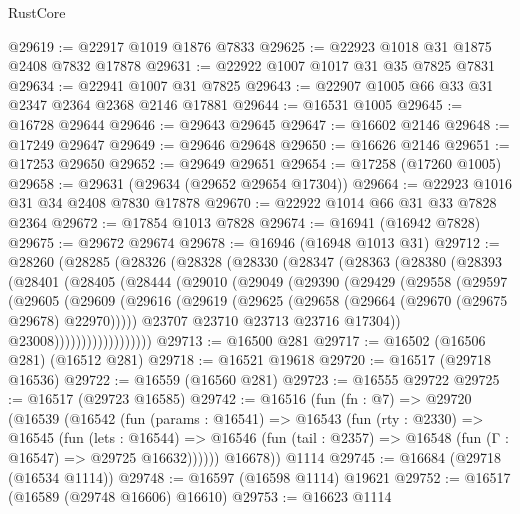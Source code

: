 \begin{lexlean}{RustCore}
\begin{coremodule}
@29619 := @22917 @1019 @1876 @7833
@29625 := @22923 @1018 @31 @1875 @2408 @7832 @17878
@29631 := @22922 @1007 @1017 @31 @35 @7825 @7831
@29634 := @22941 @1007 @31 @7825
@29643 := @22907 @1005 @66 @33 @31 @2347 @2364 @2368 @2146 @17881
@29644 := @16531 @1005
@29645 := @16728 @29644
@29646 := @29643 @29645
@29647 := @16602 @2146
@29648 := @17249 @29647
@29649 := @29646 @29648
@29650 := @16626 @2146
@29651 := @17253 @29650
@29652 := @29649 @29651
@29654 := @17258 (@17260 @1005)
@29658 := @29631 (@29634 (@29652 @29654 @17304))
@29664 := @22923 @1016 @31 @34 @2408 @7830 @17878
@29670 := @22922 @1014 @66 @31 @33 @7828 @2364
@29672 := @17854 @1013 @7828
@29674 := @16941 (@16942 @7828)
@29675 := @29672 @29674
@29678 := @16946 (@16948 @1013 @31)
@29712 := @28260
    (@28285
      (@28326
        (@28328
          (@28330
            (@28347
              (@28363
                (@28380
                  (@28393
                    (@28401
                      (@28405
                        (@28444
                          (@29010
                            (@29049
                              (@29390
                                (@29429
                                  (@29558
                                    (@29597
                                      (@29605
                                        (@29609
                                          (@29616
                                            (@29619
                                              (@29625
                                                (@29658 (@29664 (@29670 (@29675 @29678) @22970)))))
                                            @23707
                                            @23710
                                            @23713
                                            @23716
                                            @17304))
                                        @23008))))))))))))))))))
@29713 := @16500 @281
@29717 := @16502 (@16506 @281) (@16512 @281)
@29718 := @16521 @19618
@29720 := @16517 (@29718 @16536)
@29722 := @16559 (@16560 @281)
@29723 := @16555 @29722
@29725 := @16517 (@29723 @16585)
@29742 := @16516
    (fun (fn : @7) =>
    @29720
      (@16539
        (@16542
          (fun (params : @16541) =>
          @16543
            (fun (rty : @2330) =>
            @16545
              (fun (lets : @16544) =>
              @16546 (fun (tail : @2357) => @16548 (fun (Γ : @16547) => @29725 @16632))))))
        @16678))
    @1114
@29745 := @16684 (@29718 (@16534 @1114))
@29748 := @16597 (@16598 @1114) @19621
@29752 := @16517 (@16589 (@29748 @16606) @16610)
@29753 := @16623 @1114

\end{coremodule}
\end{lexlean}
